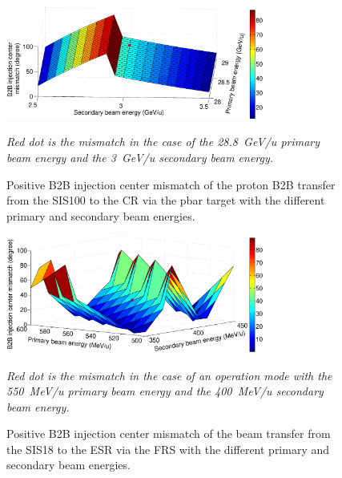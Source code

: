 \begin{figure}[!htb]
   \centering   
   \includegraphics*[width=85mm]{P100CR.eps}
   \caption{Positive B2B injection center mismatch of the proton B2B transfer from the SIS100 to the CR via the pbar target with the different primary and secondary beam energies.}{\textsl{\small{Red dot is the mismatch in the case of the \SI{28.8}{GeV/u} primary beam energy and the \SI{3}{GeV/u} secondary beam energy.}}}
   \label{1st_2nd_2}
\end{figure} 

\begin{figure}[!htb]
   \centering   
   \includegraphics*[width=85mm]{18ESR.eps}
   \caption{Positive B2B injection center mismatch of the beam transfer from the SIS18 to the ESR via the FRS with the different primary and secondary beam energies.}{\textsl{\small{Red dot is the mismatch in the case of an operation mode with the \SI{550}{MeV/u} primary beam energy and the \SI{400}{MeV/u} secondary beam energy.}}}
   \label{1st_2nd_3}
\end{figure} 


